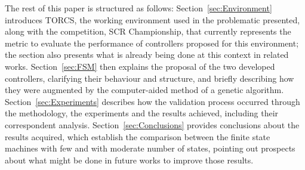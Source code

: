 	The rest of this paper is structured as follows: Section~\ref{sec:Environment} introduces TORCS, the working environment used in the problematic presented, along with the competition, SCR Championship, that currently represents the metric to evaluate the performance of controllers proposed for this environment; the section also presents what is already being done at this context in related works. Section~\ref{sec:FSM} then explains the proposal of the two developed controllers, clarifying their behaviour and structure, and briefly describing how they were augmented by the computer-aided method of a genetic algorithm. Section~\ref{sec:Experiments} describes how the validation process occurred through the methodology, the experiments and the results achieved, including their correspondent analysis. Section~\ref{sec:Conclusions} provides conclusions about the results acquired, which establish the comparison between the finite state machines with few and with moderate number of states, pointing out prospects about what might be done in future works to improve those results.
